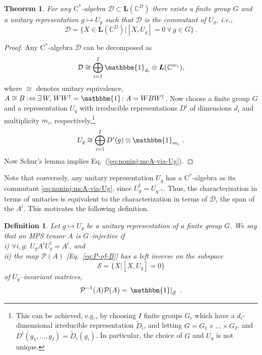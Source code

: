 \documentclass{article}
\newcommand{\openone}{\mathbbm{1}}
\newcommand{\mcS}{\mathcal S}
\newcommand{\mcP}{\mathcal P}
\newcommand{\mc}[1]{\mathcal{#1}}
\newcommand{\cstar}{$\mathrm{C}^*$}
\newcommand{\lin}[1]{{\bm L}(\mathbb C^{#1})}
\theoremstyle{plain}
\newtheorem{theorem}[lemma]{Theorem}
\newtheorem{definition}[lemma]{Definition}
\theoremstyle{definition}
\numberwithin{equation}{section}  %
\begin{document}
\begin{theorem}
    \label{thm:noninj:mcA-via-Ug}
    For any \cstar-algebra $\mathcal D\subset \lin D$
    there exists a finite group $G$ and a unitary
    representation $g\mapsto U_g$ such that $\mathcal D$ is the commutant of
    $U_g$, i.e.,
    \begin{equation}
        \label{eq:noninj:mcA-via-Ug}
        \mathcal D = \big\{ X\in\lin D
        \big\vert [X,U_g]=0\ \forall\,g\in G\big\} \ .
    \end{equation}
\end{theorem}
\begin{proof}
    Any \cstar-algebra $\mc{D}$ can be decomposed as
    \begin{equation}
        \label{eq:stdform:cstar-dec}
        \mathcal D \cong \bigoplus_{i=1}^I \openone_{d_i}\otimes \lin {m_i},
    \end{equation}
    where $\cong$ denotes unitary equivalence,
    $A\cong B:\Leftrightarrow \exists\,W,\,WW^\dagger=\openone\colon
        A = WBW^\dagger$.  Now choose a finite group $G$ and a representation $U_g$
    with irreducible representations $D^i$ of dimensions $d_i$ and
    multiplicity $m_i$, respectively,\footnote{
        This can be achieved, e.g., by choosing $I$ finite groups $G_i$ which
        have a $d_i$-dimensional irreducible representation $\tilde D_i$, and
        letting $G=G_1\times\dots\times G_I$, and $D^i(g_1,\dots,g_I)=\tilde
            D_i(g_i)$.  In particular, the choice of $G$ and $U_g$ is not unique.
    }
    \[
        U_g \cong \bigoplus_{i=1}^I D^i(g)\otimes \openone_{m_i}\ .
    \]
    Now Schur's lemma implies Eq.~(\ref{eq:noninj:mcA-via-Ug}).
\end{proof}

Note that conversely, any unitary representation $U_g$
has a \cstar-algebra as its commutant \eqref{eq:noninj:mcA-via-Ug}, since
$U_g^\dagger = U_{g^{-1}}$. Thus, the characterization in terms of
unitaries is equivalent to the characterization in terms of $\mathcal D$,
the span of the $A^i$.  This motivates the following definition.


\begin{definition}
    \label{def:Ug-inj}
    Let $g\mapsto U_g$ be a unitary representation of a finite group $G$.  We
    say that an MPS tensor $A$ is \emph{$G$--injective} if\\
    i) $\forall i,g:\ U_g A^i U_g^\dagger = A^i$, and \\
    ii) the map $\mc P(A)$ [Eq.~\ref{eq:P-of-B}]
    has a left inverse on the subspace
    \begin{equation}
        \label{eq:mpssym:symspace}
        \mathcal S=\{X|[X,U_g]=0\}
    \end{equation}
    of
    $U_g$--invariant matrices,
    \begin{equation}
        \label{eq:noninj-linv-eq}
        \mcP^{-1}(A)\mcP(A) = \left.\openone\right|_\mcS\ .
    \end{equation}
\end{definition}
\end{document}
